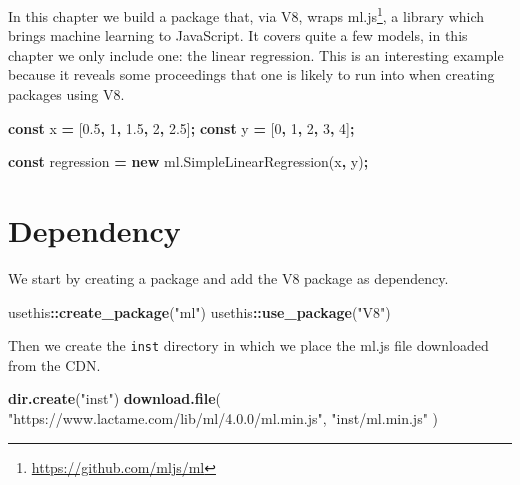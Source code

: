 \documentclass[
]{krantz}
\makeatletter
\newenvironment{Shaded}{\begin{snugshade}}{\end{snugshade}}
\newcommand{\AttributeTok}[1]{\textcolor[rgb]{0.61,0.61,0.61}{#1}}
\newcommand{\DecValTok}[1]{\textcolor[rgb]{0.06,0.06,0.06}{#1}}
\newcommand{\FloatTok}[1]{\textcolor[rgb]{0.06,0.06,0.06}{#1}}
\newcommand{\KeywordTok}[1]{\textcolor[rgb]{0.27,0.27,0.27}{\textbf{#1}}}
\newcommand{\NormalTok}[1]{#1}
\newcommand{\OperatorTok}[1]{\textcolor[rgb]{0.43,0.43,0.43}{\textbf{#1}}}
\newcommand{\StringTok}[1]{\textcolor[rgb]{0.5,0.5,0.5}{#1}}
\newcommand{\VariableTok}[1]{\textcolor[rgb]{0,0,0}{#1}}
\renewcommand{\href}[2]{#2\footnote{\url{#1}}}
\newenvironment{kframe}{%
\medskip{}
\setlength{\fboxsep}{.8em}
 \def\at@end@of@kframe{}%
 \ifinner\ifhmode%
  \def\at@end@of@kframe{\end{minipage}}%
  \begin{minipage}{\columnwidth}%
 \fi\fi%
 \def\FrameCommand##1{\hskip\@totalleftmargin \hskip-\fboxsep
 \colorbox{shadecolor}{##1}\hskip-\fboxsep
     \hskip-\linewidth \hskip-\@totalleftmargin \hskip\columnwidth}%
 \MakeFramed {\advance\hsize-\width
   \@totalleftmargin\z@ \linewidth\hsize
   \@setminipage}}%
 {\par\unskip\endMakeFramed%
 \at@end@of@kframe}
\renewenvironment{Shaded}{\begin{kframe}}{\end{kframe}}
\makeatother
\begin{document}
In this chapter we build a package that, via V8, wraps \href{https://github.com/mljs/ml}{ml.js}, a library which brings machine learning to JavaScript. It covers quite a few models, in this chapter we only include one: the linear regression. This is an interesting example because it reveals some proceedings that one is likely to run into when creating packages using V8.

\begin{Shaded}
\begin{Highlighting}[]
\KeywordTok{const}\NormalTok{ x }\OperatorTok{=}\NormalTok{ [}\FloatTok{0.5}\OperatorTok{,} \DecValTok{1}\OperatorTok{,} \FloatTok{1.5}\OperatorTok{,} \DecValTok{2}\OperatorTok{,} \FloatTok{2.5}\NormalTok{]}\OperatorTok{;}
\KeywordTok{const}\NormalTok{ y }\OperatorTok{=}\NormalTok{ [}\DecValTok{0}\OperatorTok{,} \DecValTok{1}\OperatorTok{,} \DecValTok{2}\OperatorTok{,} \DecValTok{3}\OperatorTok{,} \DecValTok{4}\NormalTok{]}\OperatorTok{;}

\KeywordTok{const}\NormalTok{ regression }\OperatorTok{=} \KeywordTok{new} \VariableTok{ml}\NormalTok{.}\AttributeTok{SimpleLinearRegression}\NormalTok{(x}\OperatorTok{,}\NormalTok{ y)}\OperatorTok{;}
\end{Highlighting}
\end{Shaded}

\hypertarget{v8-ml-dependency}{%
\section{Dependency}\label{v8-ml-dependency}}

We start by creating a package and add the V8 package as dependency.

\begin{Shaded}
\begin{Highlighting}[]
\NormalTok{usethis}\OperatorTok{::}\KeywordTok{create\_package}\NormalTok{(}\StringTok{"ml"}\NormalTok{)}
\NormalTok{usethis}\OperatorTok{::}\KeywordTok{use\_package}\NormalTok{(}\StringTok{"V8"}\NormalTok{)}
\end{Highlighting}
\end{Shaded}

Then we create the \texttt{inst} directory in which we place the ml.js file downloaded from the CDN.

\begin{Shaded}
\begin{Highlighting}[]
\KeywordTok{dir.create}\NormalTok{(}\StringTok{"inst"}\NormalTok{)}
\KeywordTok{download.file}\NormalTok{(}
  \StringTok{"https://www.lactame.com/lib/ml/4.0.0/ml.min.js"}\NormalTok{, }
  \StringTok{"inst/ml.min.js"}
\NormalTok{)}
\end{Highlighting}
\end{Shaded}
\end{document}
